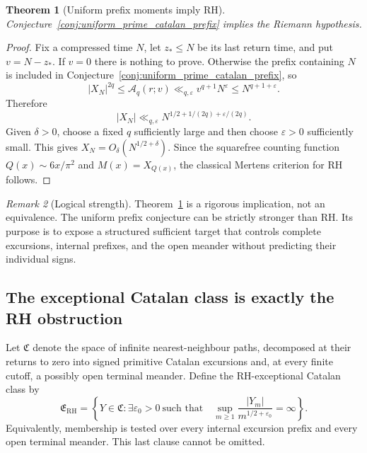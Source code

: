 \documentclass[11pt]{amsart}
\numberwithin{equation}{section}
\theoremstyle{plain}
\newtheorem{theorem}{Theorem}[section]
\theoremstyle{definition}
\theoremstyle{remark}
\newtheorem{remark}[theorem]{Remark}
\newcommand{\Mert}{M}
\newcommand{\eps}{\varepsilon}
\begin{document}
\begin{theorem}[Uniform prefix moments imply RH]
\label{thm:uniform_prefix_implies_rh}
Conjecture~\ref{conj:uniform_prime_catalan_prefix} implies the Riemann
hypothesis.
\end{theorem}

\begin{proof}
Fix a compressed time $N$, let $z_\ast\leq N$ be its last return time, and put
$v=N-z_\ast$.  If $v=0$ there is nothing to prove.  Otherwise the prefix
containing $N$ is included in Conjecture~\ref{conj:uniform_prime_catalan_prefix},
so
\begin{equation}
|X_N|^{2q}\leq\mathcal A_q(r;v)
\ll_{q,\eps}v^{q+1}N^\eps
\leq N^{q+1+\eps}.
\end{equation}
Therefore
\begin{equation}
|X_N|\ll_{q,\eps}
N^{1/2+1/(2q)+\eps/(2q)}.
\end{equation}
Given $\delta>0$, choose a fixed $q$ sufficiently large and then choose
$\eps>0$ sufficiently small.  This gives
$X_N=O_\delta(N^{1/2+\delta})$.  Since the squarefree counting function
$Q(x)\sim6x/\pi^2$ and $\Mert(x)=X_{Q(x)}$, the classical Mertens criterion
for RH follows.
\end{proof}

\begin{remark}[Logical strength]
Theorem~\ref{thm:uniform_prefix_implies_rh} is a rigorous implication, not an
equivalence.  The uniform prefix conjecture can be strictly stronger than RH.
Its purpose is to expose a structured sufficient target that controls complete
excursions, internal prefixes, and the open meander without predicting their
individual signs.
\end{remark}

\subsection{The exceptional Catalan class is exactly the RH obstruction}

Let $\mathfrak C$ denote the space of infinite nearest-neighbour paths,
decomposed at their returns to zero into signed primitive Catalan excursions
and, at every finite cutoff, a possibly open terminal meander.  Define the
RH-exceptional Catalan class by
\begin{equation}
\mathfrak E_{\mathrm{RH}}
=
\left\{Y\in\mathfrak C:
\exists\eps_0>0\ \text{such that}\quad
\sup_{m\geq1}\frac{|Y_m|}{m^{1/2+\eps_0}}=\infty
\right\}.
\label{eq:exceptional_catalan_class}
\end{equation}
Equivalently, membership is tested over every internal excursion prefix and
every open terminal meander.  This last clause cannot be omitted.
\end{document}
